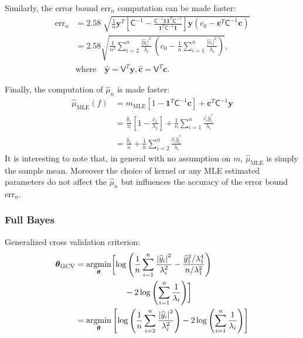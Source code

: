\documentclass[twocolumn]{svjour3}          %
\newcommand{\bm}[1]{\boldsymbol{#1}}
\newcommand{\trace}[1]{\textup{trace}{#1}}
\newcommand{\vtheta}{{\bm{\theta}}}
\newcommand{\vc}{\bm{c}}
\newcommand{\vy}{\bm{y}}
\newcommand{\vone}{\bm{1}}
\newcommand{\mC}{\mathsf{C}}
\newcommand{\mCInv}{{\mathsf{C}^{-1}}}
\newcommand{\mV}{\mathsf{V}}
\newcommand{\hmu}{\widehat{\mu}}
\newcommand{\MLE}{\text{MLE}}
\newcommand{\errn}{\text{err}_{n}}
\def\abs#1{\ensuremath{\left \lvert #1 \right \rvert}}
\providecommand{\argmin}{\operatorname*{argmin}}
\begin{document}
Similarly, the error bound {$\errn$} computation can be made faster:
\begin{align*}
\errn &=
2.58 \; \sqrt{ 
\frac{1}{n}
\vy^T 
\left[ 
\mCInv - 
\frac{ \mCInv \vone \vone^T \mCInv }{\vone^T\mCInv \vone}
\right] \vy
(c_0 - \vc^T\mC^{-1}\vc) } 
\\
&
=
{{
\displaystyle
{
2.58\sqrt{
\frac {1}{n^2} \sum_{i=2}^{n} \frac{\abs{\widehat{y}_i}^2}{\lambda_i}  
\,
\left( c_0 - \frac 1n \sum_{i=1}^n \frac{\abs{\widehat{c}_i}^2}{\lambda_i} \right) 
}
}
}}, 
\\
\nonumber
& \text{where} \quad 
\widehat{\vy} = \mV^T \vy,  
\widehat{\vc} = \mV^T \vc. 
\end{align*}




Finally, the computation of $\hmu_n$ is made faster:
\begin{align}
\nonumber
\hmu_\MLE(f) &= m_\MLE[1 - \vone^T  \mC^{-1}\vc ]
+
\vc^T \mC^{-1} \vy
\\
\nonumber
&= \frac{\widehat{y}_1}{n} \left[1 - \frac{\widehat{c}_1}{\lambda_1}\right]
+ \frac 1n \sum_{i=1}^n \frac{ \widehat{c}_i \widehat{y}_i^*}{\lambda_i}
\\
\label{eqn:hmu_complicated}
& =
 \frac{\widehat{y}_1}{n} +
 \frac 1n \sum_{i=2}^n \frac{ \widehat{c}_i \widehat{y}_i^*}{\lambda_i}
\end{align}
It is interesting to note that, in general with no assumption on $m$, $\hmu_\MLE$ is simply the sample mean. 
Moreover the choice of kernel or any MLE estimated parameters do not affect the $\hmu_n$ but influences the accuracy of the error bound $\errn$.

\subsubsection{Full Bayes}

Generalized cross validation criterion:
\begin{align*}
{\vtheta_{\textup{GCV}} }
&= \argmin_\vtheta \biggl[ \log \left ( \frac 1n \sum_{i=1}^n \frac{\abs{\widehat{y}_i}^2}{\lambda_i^2} - 
\frac{\widehat{y}_1^2/\lambda_1^4}{n/\lambda^2_1}
\right) 
\\
& \qquad \qquad \qquad - 2\log\left( \sum_{i=1}^n \frac{1}{\lambda_i} \right)
\biggr]
\\
&= \argmin_\vtheta \left[ \log \left ( \frac 1n \sum_{i=2}^n \frac{\abs{\widehat{y}_i}^2}{\lambda_i^2} 
\right) -2\log\left( \sum_{i=1}^n \frac{1}{\lambda_i} \right)
\right]
\end{align*}
\end{document}
